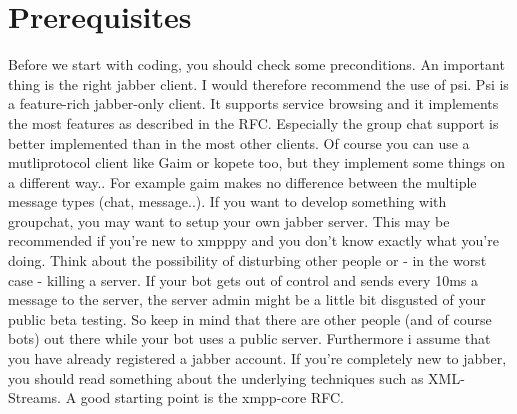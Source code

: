 \chapter{Prerequisites}

Before we start with coding, you should check some preconditions. An important thing is the right jabber client. I would therefore recommend the use of psi. Psi is a feature-rich jabber-only client. It supports service browsing and it implements the most features as described in the RFC. Especially the group chat support is better implemented than in the most other clients.
\newline
Of course you can use a mutliprotocol client like Gaim or kopete too, but they implement some things on a different way.. For example gaim makes no difference between the multiple message types (chat, message..).
\newline
\newline
If you want to develop something with groupchat, you may want to setup your own jabber server.
This may be recommended if you're new to xmpppy and you don't know exactly what you're doing.
Think about the possibility of disturbing other people or - in the worst case - killing a server.
If your bot gets out of control and sends every 10ms a message to the server, the server admin might be a little bit disgusted of your public beta testing. So keep in mind that there are other people (and of course bots) out there while your bot uses a public server.
\newline
\newline
Furthermore i assume that you have already registered a jabber account.
\newline
\newline
If you're completely new to jabber, you should read something about the underlying techniques such as XML-Streams. A good starting point is the xmpp-core RFC.
